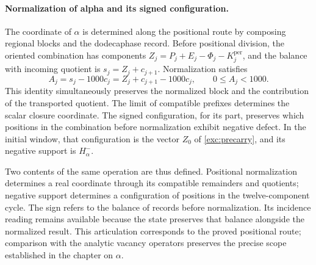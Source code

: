 \paragraph{Normalization of alpha and its signed configuration.}
\label{inc-ampl-clausura}
The coordinate of $\alpha$ is determined along the positional route by
composing regional blocks and the dodecaphase record. Before
positional division, the oriented combination has components
$Z_j=P_j+E_j-\Phi_j-K_j^{\mathrm{per}}$, and the balance with incoming quotient
is $s_j=Z_j+c_{j+1}$. Normalization satisfies
\begin{equation}
 A_j=s_j-1000c_j=Z_j+c_{j+1}-1000c_j,\qquad 0\leq A_j<1000.
 \label{inc-ampl-normalizacion}
\end{equation}
This identity simultaneously preserves the normalized block and the
contribution of the transported quotient. The limit of compatible
prefixes determines the scalar closure coordinate. The
signed configuration, for its part, preserves which positions in the
combination before normalization exhibit negative defect.
In the initial window, that configuration is the vector $Z_0$ of
\eqref{exc:precarry}, and its negative support is $H^-_\alpha$.

Two contents of the same operation are thus defined. Positional
normalization determines a real coordinate through its compatible
remainders and quotients; negative support determines a
configuration of positions in the twelve-component cycle. The sign
refers to the balance of records before normalization. Its incidence
reading remains available because the state preserves that balance
alongside the normalized result. This articulation corresponds to the
proved positional route; comparison with the analytic vacancy
operators preserves the precise scope established in the chapter on
$\alpha$.
